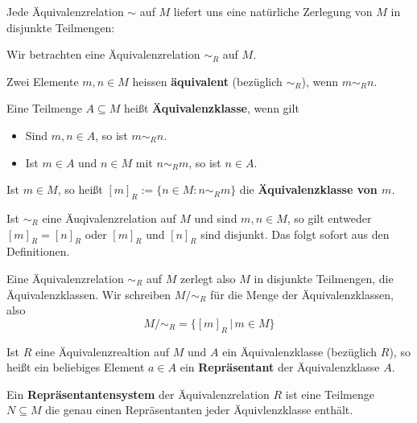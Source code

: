 Jede Äquivalenzrelation $\sim$ auf $M$ liefert uns eine natürliche Zerlegung von $M$ in disjunkte Teilmengen:

\begin{definition} Wir betrachten eine Äquivalenzrelation $\sim_R$ auf $M$.

Zwei Elemente $m, n \in M$ hei{ss}en \textbf{äquivalent} (bezüglich $\sim_R$), wenn $m \sim_R n$.

Eine Teilmenge $A \subseteq M$ heißt \textbf{Äquivalenzklasse}, wenn gilt

\begin{itemize}
\item Sind $m, n \in A$, so ist $m \sim_R n$.
\item Ist $m \in A$ und $n \in M$ mit $n \sim_R m$, so ist $n \in A$.
\end{itemize}

Ist $m \in M$, so heißt $[m]_R := \{ n \in M: n \sim_R m \}$ die \textbf{Äquivalenzklasse von $m$}.
\end{definition}

\begin{notiz} Ist $\sim_R$ eine Äuqivalenzrelation auf $M$ und sind $m, n \in M$, so gilt entweder  
$[m]_R = [n]_R$ oder $[m]_R$ und $[n]_R$ sind disjunkt. Das folgt sofort aus den Definitionen.

Eine Äquivalenzrelation $\sim_R$ auf $M$ zerlegt also $M$ in disjunkte Teilmengen, die Äquivalenzklassen. 
Wir schreiben $M/\sim_R$ für die Menge der Äquivalenzklassen, also 
  	$$ M/\sim_R = \{ [m]_R\, \vert \, m \in M \} $$
\end{notiz}

\begin{definition} Ist $R$ eine Äquivalenzrealtion auf $M$ und $A$ ein Äquivalenzklasse (bezüglich $R$), 
so heißt ein beliebiges Element $a \in A$ ein 
\textbf{Repräsentant} der Äquivalenzklasse $A$.

Ein \textbf{Repräsentantensystem} der Äquivalenzrelation 
$R$ ist eine Teilmenge $N \subseteq M$ die genau einen Repräsentanten jeder Äquivlenzklasse enthält.
\end{definition}

